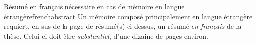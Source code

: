 \begin{dbwarning}{Résumé en français nécessaire en cas de mémoire en langue
    étrangère}{frenchabstract}
  Un mémoire composé principalement en langue étrangère  requiert, en sus de la page de
  résumé(s) ci-dessus, un résumé \emph{en français} de la thèse. Celui-ci doit
  être \emph{substantiel}, d'une dizaine de pages environ.
\end{dbwarning}


